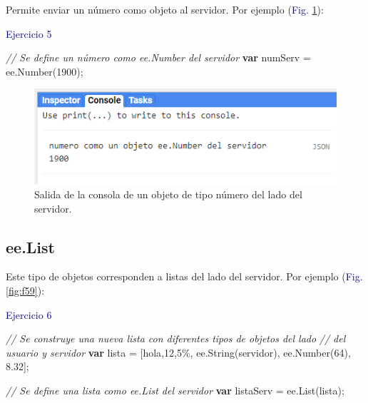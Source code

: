 \documentclass[
  12pt,
  letterpaper,
  twoside]{book}
\newenvironment{Shaded}{\begin{snugshade}}{\end{snugshade}}
\newcommand{\CommentTok}[1]{\textcolor[rgb]{0.24,0.58,0.00}{\textit{#1}}}
\newcommand{\DecValTok}[1]{\textcolor[rgb]{0.28,0.53,0.93}{#1}}
\newcommand{\FloatTok}[1]{\textcolor[rgb]{0.28,0.53,0.93}{#1}}
\newcommand{\FunctionTok}[1]{\textcolor[rgb]{0.48,0.12,0.64}{#1}}
\newcommand{\KeywordTok}[1]{\textcolor[rgb]{0.00,0.00,0.00}{\textbf{#1}}}
\newcommand{\NormalTok}[1]{#1}
\newcommand{\OperatorTok}[1]{\textcolor[rgb]{0.00,0.00,0.00}{#1}}
\newcommand{\StringTok}[1]{\textcolor[rgb]{0.87,0.29,0.22}{#1}}
\begin{document}
Permite enviar un número como objeto al servidor. Por ejemplo (\textcolor{darkblue}{Fig.} \ref{fig:f58}):

\textcolor{darkblue}{Ejercicio 5}

\begin{Shaded}
\begin{Highlighting}[]
\CommentTok{// Se define un número como ee.Number del servidor}
\KeywordTok{var}\NormalTok{ numServ }\OperatorTok{=}\NormalTok{ ee}\OperatorTok{.}\FunctionTok{Number}\NormalTok{(}\DecValTok{1900}\NormalTok{)}\OperatorTok{;}                              
\end{Highlighting}
\end{Shaded}

\begin{figure}[H]

{\centering \includegraphics[width=0.95\linewidth]{Img/ej5} 

}

\caption{Salida de la consola de un objeto de tipo número del lado del servidor.}\label{fig:f58}
\end{figure}

\hypertarget{ee.list}{%
\subsection*{ee.List}\label{ee.list}}

Este tipo de objetos corresponden a listas del lado del servidor. Por ejemplo (\textcolor{darkblue}{Fig.} \ref{fig:f59}):

\textcolor{darkblue}{Ejercicio 6}

\begin{Shaded}
\begin{Highlighting}[]
\CommentTok{// Se construye una nueva lista con diferentes tipos de objetos del lado }
\CommentTok{// del usuario y servidor}
\KeywordTok{var}\NormalTok{ lista }\OperatorTok{=}\NormalTok{ [}\StringTok{\textquotesingle{}hola\textquotesingle{}}\OperatorTok{,}\StringTok{\textquotesingle{}12\textquotesingle{}}\OperatorTok{,}\StringTok{\textquotesingle{}5\%\textquotesingle{}}\OperatorTok{,}\NormalTok{ ee}\OperatorTok{.}\FunctionTok{String}\NormalTok{(}\StringTok{\textquotesingle{}servidor\textquotesingle{}}\NormalTok{)}\OperatorTok{,}\NormalTok{ ee}\OperatorTok{.}\FunctionTok{Number}\NormalTok{(}\DecValTok{64}\NormalTok{)}\OperatorTok{,} \FloatTok{8.32}\NormalTok{]}\OperatorTok{;}

\CommentTok{// Se define una lista como ee.List del servidor }
\KeywordTok{var}\NormalTok{ listaServ }\OperatorTok{=}\NormalTok{ ee}\OperatorTok{.}\FunctionTok{List}\NormalTok{(lista)}\OperatorTok{;}             
\end{Highlighting}
\end{Shaded}
\end{document}
